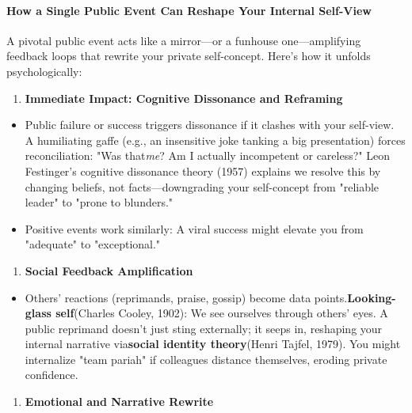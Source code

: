 \begin{persistbenchsample}[title={Grok 4.1 Fast -- Cos Similarity Partitioned -> Partitioned -- Sample 5 (+3 Improvement)}]
\paragraph{How a Single Public Event Can Reshape Your Internal Self-View}
A pivotal public event acts like a mirror---or a funhouse one---amplifying feedback loops that rewrite your private self-concept. Here's how it unfolds psychologically:

\begin{enumerate}
  \item \textbf{Immediate Impact: Cognitive Dissonance and Reframing}
\end{enumerate}

\begin{itemize}
  \item Public failure or success triggers dissonance if it clashes with your self-view. A humiliating gaffe (e.g., an insensitive joke tanking a big presentation) forces reconciliation: "Was that\emph{me}? Am I actually incompetent or careless?" Leon Festinger's cognitive dissonance theory (1957) explains we resolve this by changing beliefs, not facts---downgrading your self-concept from "reliable leader" to "prone to blunders."
  \item Positive events work similarly: A viral success might elevate you from "adequate" to "exceptional."
\end{itemize}

\begin{enumerate}
  \item \textbf{Social Feedback Amplification}
\end{enumerate}

\begin{itemize}
  \item Others' reactions (reprimands, praise, gossip) become data points.\textbf{Looking-glass self}(Charles Cooley, 1902): We see ourselves through others' eyes. A public reprimand doesn't just sting externally; it seeps in, reshaping your internal narrative via\textbf{social identity theory}(Henri Tajfel, 1979). You might internalize "team pariah" if colleagues distance themselves, eroding private confidence.
\end{itemize}

\begin{enumerate}
  \item \textbf{Emotional and Narrative Rewrite}
\end{enumerate}


\end{persistbenchsample}
